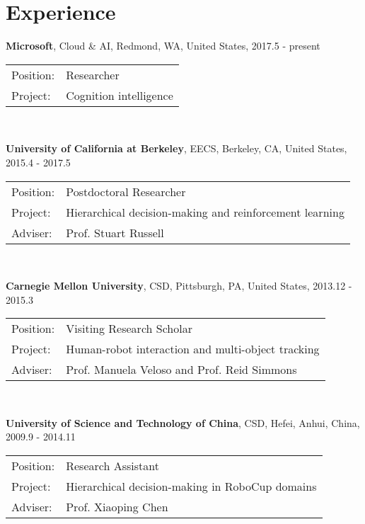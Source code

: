 \documentclass[letterpaper, fontset=adobe, 10pt]{ctexart}
\renewenvironment{itemize}{
  \begin{list}{}{
    \setlength{\leftmargin}{1.5em}
  }
}{
  \end{list}
}
\begin{document}
\section*{Experience}
\begin{itemize}
	\item {\bf Microsoft}, Cloud \& AI, Redmond, WA, United States, 2017.5 - present \\
	      \begin{tabular}{ll}
	      	Position: & Researcher                       \\
	      	Project:  & Cognition intelligence \\
	      \end{tabular} \\    
	\item {\bf University of California at Berkeley}, EECS, Berkeley, CA, United States, 2015.4 - 2017.5 \\
	      \begin{tabular}{ll}
	      	Position: & Postdoctoral Researcher                                 \\
	      	Project:  & Hierarchical decision-making and reinforcement learning \\
	      	Adviser:  & Prof. Stuart Russell                                    \\
	      \end{tabular} \\
	\item {\bf Carnegie Mellon University}, CSD, Pittsburgh, PA, United States, 2013.12 - 2015.3 \\
	      \begin{tabular}{ll}
	      	Position: & Visiting Research Scholar                   \\
	      	Project:  & Human-robot interaction and multi-object tracking        \\
	      	Adviser:  & Prof. Manuela Veloso and Prof. Reid Simmons \\
	      \end{tabular} \\
	\item {\bf University of Science and Technology of China}, CSD, Hefei, Anhui, China, 2009.9 - 2014.11 \\
	      \begin{tabular}{ll}
	      	Position: & Research Assistant                              \\
	      	Project:  & Hierarchical decision-making in RoboCup domains \\
	      	Adviser:  & Prof. Xiaoping Chen                             \\
	      \end{tabular} \\
\end{itemize}
\end{document}
